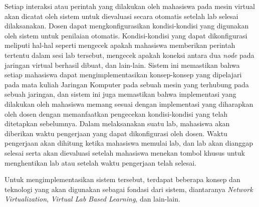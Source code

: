 Setiap interaksi atau perintah yang dilakukan oleh mahasiswa pada mesin virtual akan dicatat oleh sistem untuk dievaluasi secara otomatis setelah lab selesai dilaksanakan.
Dosen dapat mengkonfigurasikan kondisi-kondisi yang digunakan oleh sistem untuk penilaian otomatis. Kondisi-kondisi yang dapat dikonfigurasi meliputi hal-hal seperti mengecek
apakah mahasiswa memberikan perintah tertentu dalam sesi lab tersebut, mengecek apakah koneksi antara dua \textit{node} pada jaringan virtual berhasil dibuat, dan lain-lain. 
Sistem ini memastikan bahwa setiap mahasiswa dapat mengimplementasikan konsep-konsep yang dipelajari pada mata kuliah Jaringan Komputer pada sebuah mesin yang terhubung pada sebuah jaringan,
dan sistem ini juga memastikan bahwa implementasi yang dilakukan oleh mahasiswa memang sesuai dengan implementasi yang diharapkan oleh dosen dengan memanfaatkan pengecekan kondisi-kondisi
yang telah ditetapkan sebelumnya. Dalam melaksanakan suatu lab, mahasiswa akan diberikan waktu pengerjaan yang dapat dikonfigurasi oleh dosen. Waktu pengerjaan akan dihitung ketika mahasiswa
memulai lab, dan lab akan dianggap selesai serta akan dievaluasi setelah mahasiswa menekan tombol khusus untuk menghentikan lab atau setelah waktu pengerjaan telah selesai.
\par

Untuk mengimplementasikan sistem tersebut, terdapat beberapa konsep dan teknologi yang akan digunakan sebagai fondasi dari sistem, diantaranya \textit{Network Virtualization},
\textit{Virtual Lab Based Learning}, dan lain-lain.
